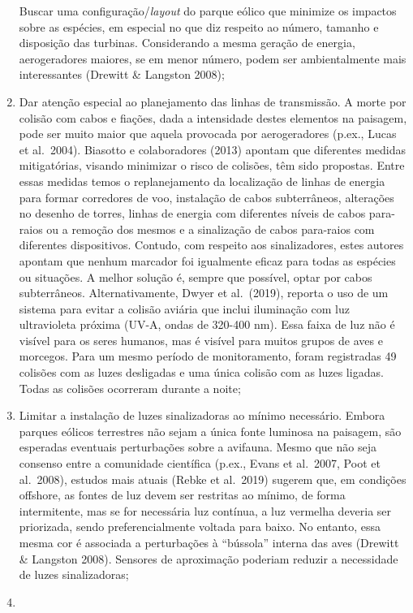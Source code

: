 \documentclass[
  oneside]{scrbook}
\begin{document}
\begin{enumerate}
  Buscar uma configuração/\emph{layout} do parque eólico que minimize os impactos sobre as espécies, em especial no que diz respeito ao número, tamanho e disposição das turbinas. Considerando a mesma geração de energia, aerogeradores maiores, se em menor número, podem ser ambientalmente mais interessantes (Drewitt \& Langston 2008);
\item
  Dar atenção especial ao planejamento das linhas de transmissão. A morte por colisão com cabos e fiações, dada a intensidade destes elementos na paisagem, pode ser muito maior que aquela provocada por aerogeradores (p.ex., Lucas et al.~2004). Biasotto e colaboradores (2013) apontam que diferentes medidas mitigatórias, visando minimizar o risco de colisões, têm sido propostas. Entre essas medidas temos o replanejamento da localização de linhas de energia para formar corredores de voo, instalação de cabos subterrâneos, alterações no desenho de torres, linhas de energia com diferentes níveis de cabos para-raios ou a remoção dos mesmos e a sinalização de cabos para-raios com diferentes dispositivos. Contudo, com respeito aos sinalizadores, estes autores apontam que nenhum marcador foi igualmente eficaz para todas as espécies ou situações. A melhor solução é, sempre que possível, optar por cabos subterrâneos. Alternativamente, Dwyer et al.~(2019), reporta o uso de um sistema para evitar a colisão aviária que inclui iluminação com luz ultravioleta próxima (UV-A, ondas de 320-400 nm). Essa faixa de luz não é visível para os seres humanos, mas é visível para muitos grupos de aves e morcegos. Para um mesmo período de monitoramento, foram registradas 49 colisões com as luzes desligadas e uma única colisão com as luzes ligadas. Todas as colisões ocorreram durante a noite;
\item
  Limitar a instalação de luzes sinalizadoras ao mínimo necessário. Embora parques eólicos terrestres não sejam a única fonte luminosa na paisagem, são esperadas eventuais perturbações sobre a avifauna. Mesmo que não seja consenso entre a comunidade científica (p.ex., Evans et al.~2007, Poot et al.~2008), estudos mais atuais (Rebke et al.~2019) sugerem que, em condições offshore, as fontes de luz devem ser restritas ao mínimo, de forma intermitente, mas se for necessária luz contínua, a luz vermelha deveria ser priorizada, sendo preferencialmente voltada para baixo. No entanto, essa mesma cor é associada a perturbações à ``bússola'' interna das aves (Drewitt \& Langston 2008). Sensores de aproximação poderiam reduzir a necessidade de luzes sinalizadoras;
\item

\end{enumerate}
\end{document}
